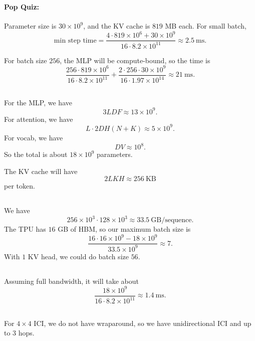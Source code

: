 \documentclass[11pt]{article}
\newcommand{\F}{F}
\newcommand{\ms}{\mathrm{ms}}
\newcommand{\exercisebreak}{\Needspace{8\baselineskip}}
\newcommand{\quizbreak}{\Needspace{6\baselineskip}}
\begin{document}
\clearpage
\section{}

\quizbreak
\paragraph{Pop Quiz:}
Parameter size is $30\times 10^9$, and the KV cache is $819$ MB each. For small batch,
\[
  \text{min step time}
  =
  \frac{4\cdot 819\times 10^6+30\times 10^9}
       {16\cdot 8.2\times 10^{11}}
  \approx 2.5\ \ms.
\]

For batch size $256$, the MLP will be compute-bound, so the time is
\[
  \frac{256\cdot 819\times 10^6}{16\cdot 8.2\times 10^{11}}
  +
  \frac{2\cdot 256\cdot 30\times 10^9}{16\cdot 1.97\times 10^{14}}
  \approx 21\ \ms.
\]

\exercisebreak
\subsection{}
For the MLP, we have
\[
  3LD\F \approx 13\times 10^9.
\]
For attention, we have
\[
  L\cdot 2DH(N+K)\approx 5\times 10^9.
\]
For vocab, we have
\[
  DV\approx 10^8.
\]
So the total is about $18\times 10^9$ parameters.

The KV cache will have
\[
  2LKH\approx 256\ \mathrm{KB}
\]
per token.

\exercisebreak
\subsection{}
We have
\[
  256\times 10^3\cdot 128\times 10^3
  \approx 33.5\ \mathrm{GB/sequence}.
\]
The TPU has $16$ GB of HBM, so our maximum batch size is
\[
  \frac{16\cdot 16\times 10^9-18\times 10^9}{33.5\times 10^9}
  \approx 7.
\]
With $1$ KV head, we could do batch size $56$.

\exercisebreak
\subsection{}
Assuming full bandwidth, it will take about
\[
  \frac{18\times 10^9}{16\cdot 8.2\times 10^{11}}
  \approx 1.4\ \ms.
\]

\exercisebreak
\subsection{}
For $4\times 4$ ICI, we do not have wraparound, so we have unidirectional ICI and up to $3$ hops.
\end{document}
